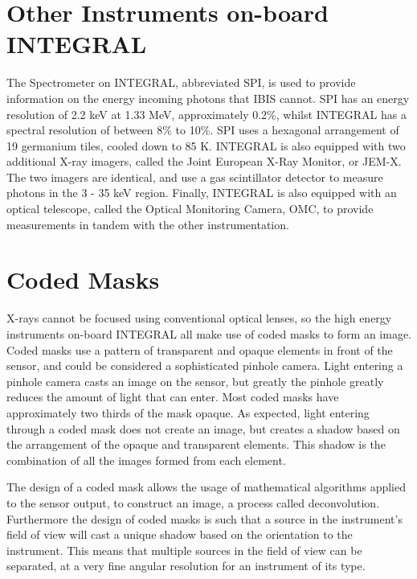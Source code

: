 \section{Other Instruments on-board INTEGRAL}
The Spectrometer on INTEGRAL, abbreviated SPI, is used to provide information on the energy incoming photons that IBIS cannot. SPI has an energy resolution of 2.2 keV at 1.33 MeV, approximately 0.2\%, whilst INTEGRAL has a spectral resolution of between 8\% to 10\%. SPI uses a hexagonal arrangement of 19 germanium tiles, cooled down to 85 K. 
INTEGRAL is also equipped with two additional X-ray imagers, called the Joint European X-Ray Monitor, or JEM-X. The two imagers are identical, and use a gas scintillator detector to measure photons in the 3 - 35 keV region. Finally, INTEGRAL is also equipped with an optical telescope, called the Optical Monitoring Camera, OMC, to provide measurements in tandem with the other instrumentation.

\section{Coded Masks}
X-rays cannot be focused using conventional optical lenses, so the high energy instruments on-board INTEGRAL all make use of coded masks to form an image. Coded masks use a pattern of transparent and opaque elements in front of the sensor, and could be considered a sophisticated pinhole camera. Light entering a pinhole camera casts an image on the sensor, but greatly the pinhole greatly reduces the amount of light that can enter. Most coded masks have approximately two thirds of the mask opaque. As expected, light entering through a coded mask does not create an image, but creates a shadow based on the arrangement of the opaque and transparent elements. This shadow is the combination of all the images formed from each element. 

The design of a coded mask allows the usage of mathematical algorithms applied to the sensor output, to construct an image, a process called deconvolution. Furthermore the design of coded masks is such that a source in the instrument's field of view will cast a unique shadow based on the orientation to the instrument. This means that multiple sources in the field of view can be separated, at a very fine angular resolution for an instrument of its type. 
